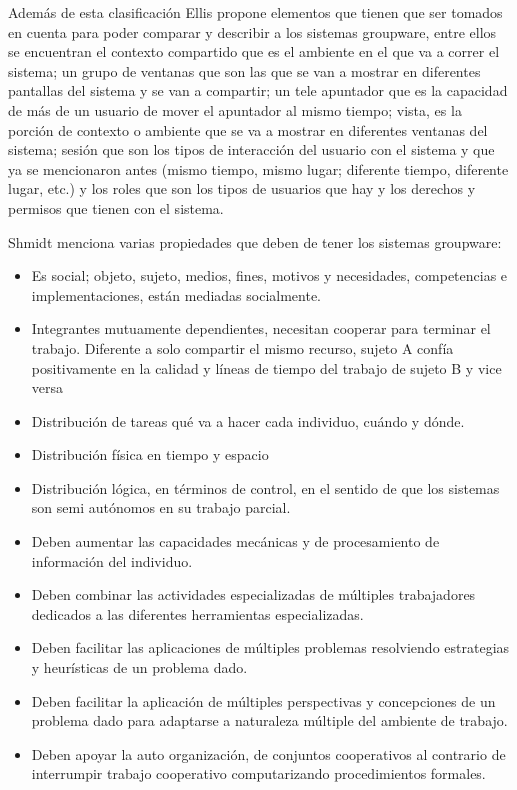 Adem\'as de esta clasificaci\'on Ellis\cite{ellis1991groupware} propone elementos que tienen que ser tomados en cuenta para poder comparar y describir a los sistemas groupware, entre ellos se encuentran el contexto compartido que es el ambiente en el que va a correr el sistema; un grupo de ventanas que son las que se van a mostrar en diferentes pantallas del sistema y se van a compartir; un tele apuntador que es la capacidad de m\'as de un usuario de mover el apuntador al mismo tiempo; vista, es la porci\'on de contexto o ambiente que se va a mostrar en diferentes ventanas del sistema; sesi\'on que son los tipos de interacci\'on del usuario con el sistema y que ya se mencionaron antes (mismo tiempo, mismo lugar; diferente tiempo, diferente lugar, etc.) y los roles que son los tipos de usuarios que hay y los derechos y permisos que tienen con el sistema.

Shmidt \cite{schmidt1992taking} menciona varias propiedades que deben de tener los sistemas groupware:
\begin{itemize}
\item Es social; objeto, sujeto, medios, fines, motivos y necesidades, competencias e implementaciones, est\'an mediadas socialmente.
\item Integrantes mutuamente dependientes, necesitan cooperar para terminar el trabajo. Diferente a solo compartir el mismo recurso, sujeto A conf\'ia positivamente en la calidad y l\'ineas de tiempo del trabajo de sujeto B y vice versa
\item Distribuci\'on de tareas qu\'e va a hacer cada individuo, cu\'ando y d\'onde.
\item Distribuci\'on f\'isica en tiempo y espacio
\item Distribuci\'on l\'ogica, en t\'erminos de control, en el sentido de que los sistemas son semi aut\'onomos en su trabajo parcial.
\item Deben aumentar las capacidades mec\'anicas y de procesamiento de informaci\'on del individuo.
\item Deben combinar las actividades especializadas de m\'ultiples trabajadores dedicados a las diferentes herramientas especializadas.
\item Deben facilitar las aplicaciones de m\'ultiples problemas resolviendo estrategias y heur\'isticas de un problema dado.
\item Deben facilitar la aplicaci\'on de m\'ultiples perspectivas y concepciones de un problema dado para adaptarse a naturaleza m\'ultiple del ambiente de trabajo.
\item Deben apoyar la auto organizaci\'on, de conjuntos cooperativos al contrario de interrumpir trabajo cooperativo computarizando procedimientos formales.
\end{itemize}

